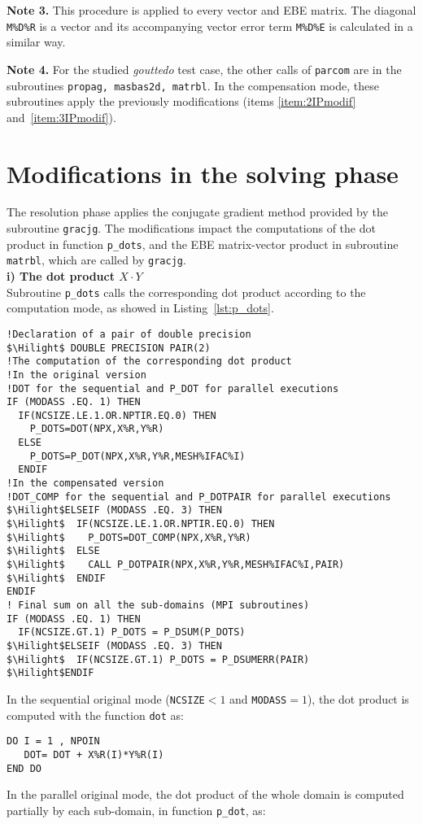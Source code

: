 %
%
\begin{description}
\item \textbf{Note 3.} This procedure is applied to every vector
and EBE matrix. The diagonal \texttt{M\%D\%R} is a vector 
and its accompanying vector error term \texttt{M\%D\%E} is calculated in a similar way.
%
\item \textbf{Note 4.} For the studied \textit{gouttedo} test case, the other calls of \texttt{parcom} are 
in the subroutines \texttt{propag, masbas2d, matrbl}. In the compensation mode, 
these subroutines apply the previously modifications
(items \ref{item:2IPmodif} and~\ref{item:3IPmodif}).
\end{description}
\section{Modifications in the solving phase}
\label{sec:imple_solve}
%
The resolution phase applies the conjugate gradient method
provided by the subroutine \texttt{gracjg}.
The modifications impact the computations of the dot product
in function \texttt{p\_dots}, and the EBE
matrix-vector product in subroutine \texttt{matrbl},
which are called by \texttt{gracjg}.\\
%
\textbf{i) The dot product $X \cdot Y$}\\
Subroutine \texttt{p\_dots} calls the corresponding dot product according to the computation mode, 
as showed in Listing~\ref{lst:p_dots}.
%
\begin{lstlisting}[language=TelFortran, caption={The calls of the corresponding dot product in \texttt{p\_dots}},label={lst:p_dots},escapechar=\$]
!Declaration of a pair of double precision 
$\Hilight$ DOUBLE PRECISION PAIR(2)
!The computation of the corresponding dot product 
!In the original version 
!DOT for the sequential and P_DOT for parallel executions
IF (MODASS .EQ. 1) THEN
  IF(NCSIZE.LE.1.OR.NPTIR.EQ.0) THEN
    P_DOTS=DOT(NPX,X%R,Y%R)
  ELSE
    P_DOTS=P_DOT(NPX,X%R,Y%R,MESH%IFAC%I)
  ENDIF
!In the compensated version 
!DOT_COMP for the sequential and P_DOTPAIR for parallel executions
$\Hilight$ELSEIF (MODASS .EQ. 3) THEN
$\Hilight$  IF(NCSIZE.LE.1.OR.NPTIR.EQ.0) THEN
$\Hilight$    P_DOTS=DOT_COMP(NPX,X%R,Y%R)
$\Hilight$  ELSE
$\Hilight$    CALL P_DOTPAIR(NPX,X%R,Y%R,MESH%IFAC%I,PAIR)
$\Hilight$  ENDIF
ENDIF
! Final sum on all the sub-domains (MPI subroutines) 
IF (MODASS .EQ. 1) THEN
  IF(NCSIZE.GT.1) P_DOTS = P_DSUM(P_DOTS)
$\Hilight$ELSEIF (MODASS .EQ. 3) THEN
$\Hilight$  IF(NCSIZE.GT.1) P_DOTS = P_DSUMERR(PAIR)
$\Hilight$ENDIF
\end{lstlisting}
%
In the sequential original mode (\texttt{NCSIZE}$<1$ and \texttt{MODASS}$=1$), 
the dot product is computed with the function \texttt{dot} as:
\begin{lstlisting}[language=TelFortran,numbers=none,frame=none,escapechar=\$]
DO I = 1 , NPOIN
   DOT= DOT + X%R(I)*Y%R(I)
END DO
\end{lstlisting}
%
In the parallel original mode, the dot product of the whole domain 
is computed partially by each sub-domain, in function \texttt{p\_dot}, as:

